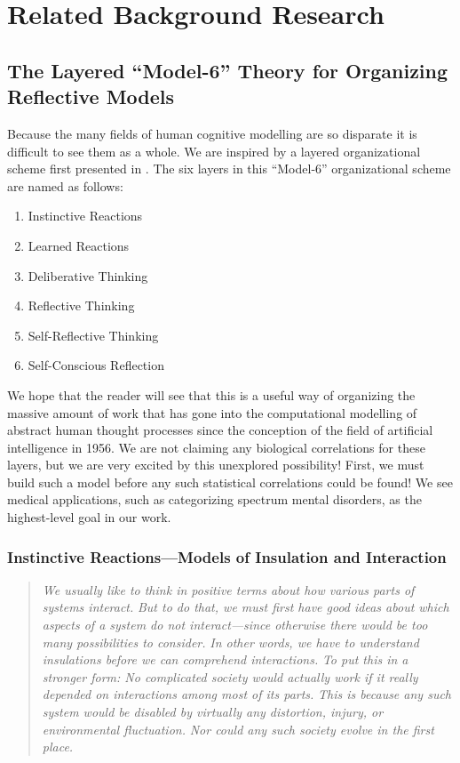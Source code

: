 \chapter{Related Background Research}
\label{other_models-chapter}

\section{The Layered ``Model-6'' Theory for Organizing Reflective Models}

Because the many fields of human cognitive modelling are so disparate
it is difficult to see them as a whole.  We are inspired by a layered
organizational scheme first presented in \cite{minsky:2006}.  The
six layers in this ``Model-6'' organizational scheme are named as
follows:

\begin{enumerate}
\item{Instinctive Reactions}
\item{Learned Reactions}
\item{Deliberative Thinking}
\item{Reflective Thinking}
\item{Self-Reflective Thinking}
\item{Self-Conscious Reflection}
\end{enumerate}

We hope that the reader will see that this is a useful way of organizing the massive amount of work that has gone into the computational modelling of abstract human thought processes since the conception of the field of artificial intelligence in 1956.
We are not claiming any biological correlations for these layers, but we are very excited by this unexplored possibility!
First, we must build such a model before any such statistical correlations could be found!
We see medical applications, such as categorizing spectrum mental disorders, as the highest-level goal in our work.

\subsection{Instinctive Reactions---Models of Insulation and Interaction}

\begin{quotation}
  \emph{We usually like to think in positive terms about how various parts of systems interact.}
  \emph{But to do that, we must first have good ideas about which aspects of a system do \emph{not} interact---since otherwise there would be too many possibilities to consider.}
  \emph{In other words, we have to understand \emph{insulations} before we can comprehend interactions.}
  \emph{To put this in a stronger form: \emph{No complicated society would actually work if it really depended on interactions among most of its parts}.}
  \emph{This is because any such system would be disabled by virtually any distortion, injury, or environmental fluctuation.}
  \emph{Nor could any such society evolve in the first place.}
\end{quotation}  

